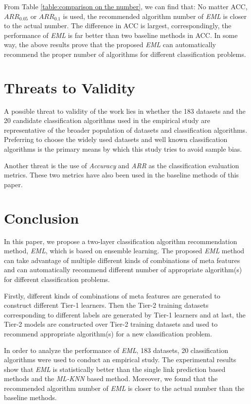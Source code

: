 \documentclass[review,3p,twocolumn,times]{elsarticle}
\begin{document}
From Table \ref{table:comparison on the number}, we can find that: No matter ACC, $ARR_{0.05}$ or $ARR_{0.1}$ is used, the recommended algorithm number of \emph{EML} is closer to the actual number. The difference in ACC is largest, correspondingly, the performance of \emph{EML} is far better than two baseline methods in ACC. In some way, the above results prove that the proposed \emph{EML} can automatically recommend the proper number of algorithms for different classification problems.


\section{Threats to Validity}
\label{threats}

A possible threat to validity of the work lies in whether the 183 datasets and the 20 candidate classification algorithms used in the empirical study are representative of the broader population of datasets and classification algorithms. Preferring to choose the widely used datasets and well known classification algorithms is the primary means by which this study tries to avoid sample bias.

Another threat is the use of \emph{Accuracy} and \emph{ARR} as the classification evaluation metrics. These two metrics have also been used in the baseline methods of this paper.

\section{Conclusion}	
\label{conclusion}

In this paper, we propose a two-layer classification algorithm recommendation method, \emph{EML}, which is based on ensemble learning. The proposed \emph{EML} method can take advantage of multiple different kinds of combinations of meta features and can automatically recommend different number of appropriate algorithm(s) for different classification problems.

Firstly, different kinds of combinations of meta features are generated to construct different Tier-1 learners. Then the Tier-2 training datasets corresponding to different labels are generated by Tier-1 learners and at last, the Tier-2 models are constructed over Tier-2 training datasets and used to recommend appropriate algorithm(s) for a new classification problem. 

In order to analyze the performance of \emph{EML}, 183 datasets, 20 classification algorithms were used to conduct an empirical study. The experimental results show that \emph{EML} is statistically better than the single link prediction based methods and the \emph{ML-KNN} based method. Moreover, we found that the recommended algorithm number of \emph{EML} is closer to the actual number than the baseline methods.
\end{document}
